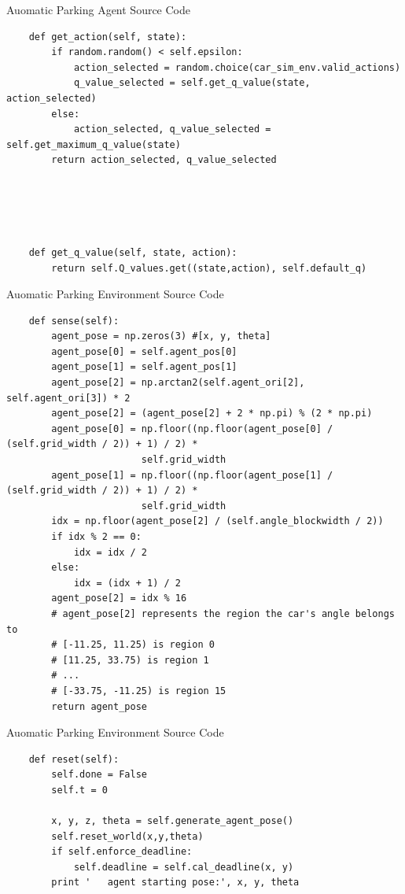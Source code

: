\documentclass{beamer}
\begin{document}
\begin{frame}[fragile]{Auomatic Parking Agent Source Code}
\tiny{
\begin{verbatim}
    def get_action(self, state):
        if random.random() < self.epsilon:
            action_selected = random.choice(car_sim_env.valid_actions)
            q_value_selected = self.get_q_value(state, action_selected)
        else:
            action_selected, q_value_selected = self.get_maximum_q_value(state)
        return action_selected, q_value_selected





    def get_q_value(self, state, action):
        return self.Q_values.get((state,action), self.default_q)
\end{verbatim}
}
\end{frame}


\begin{frame}[fragile]{Auomatic Parking Environment Source Code}
\tiny{
\begin{verbatim}
    def sense(self):
        agent_pose = np.zeros(3) #[x, y, theta]
        agent_pose[0] = self.agent_pos[0]
        agent_pose[1] = self.agent_pos[1]
        agent_pose[2] = np.arctan2(self.agent_ori[2], self.agent_ori[3]) * 2
        agent_pose[2] = (agent_pose[2] + 2 * np.pi) % (2 * np.pi)
        agent_pose[0] = np.floor((np.floor(agent_pose[0] / (self.grid_width / 2)) + 1) / 2) *
                        self.grid_width
        agent_pose[1] = np.floor((np.floor(agent_pose[1] / (self.grid_width / 2)) + 1) / 2) * 
                        self.grid_width
        idx = np.floor(agent_pose[2] / (self.angle_blockwidth / 2))
        if idx % 2 == 0:
            idx = idx / 2
        else:
            idx = (idx + 1) / 2
        agent_pose[2] = idx % 16
        # agent_pose[2] represents the region the car's angle belongs to
        # [-11.25, 11.25) is region 0
        # [11.25, 33.75) is region 1
        # ...
        # [-33.75, -11.25) is region 15
        return agent_pose
\end{verbatim}
}
\end{frame}

\begin{frame}[fragile]{Auomatic Parking Environment Source Code}
\tiny{
\begin{verbatim}
    def reset(self):
        self.done = False
        self.t = 0

        x, y, z, theta = self.generate_agent_pose()
        self.reset_world(x,y,theta)
        if self.enforce_deadline:
            self.deadline = self.cal_deadline(x, y)
        print '   agent starting pose:', x, y, theta
\end{verbatim}
}
\end{frame}
\end{document}
